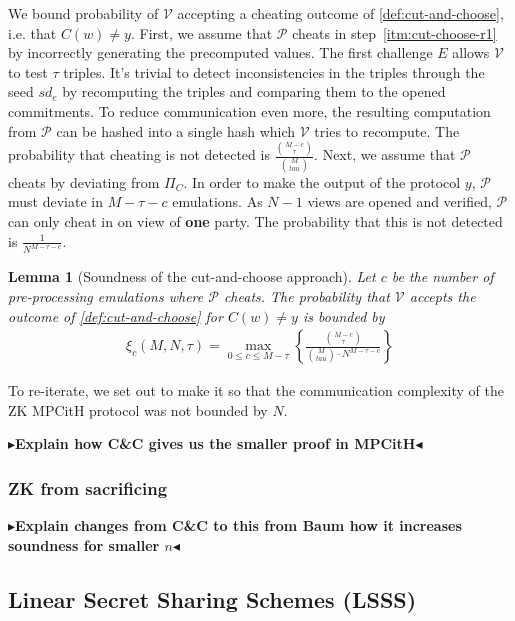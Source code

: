 \documentclass[twoside,11pt]{report}
\theoremstyle{definition}
\theoremstyle{plain}
\newtheorem{lemma}{Lemma}[section]
\newcommand{\todo}[1]{{\color[rgb]{.5,0,0}\textbf{$\blacktriangleright$#1$\blacktriangleleft$}}}
\begin{document}
We bound probability of $\mathcal{V}$ accepting a cheating outcome of \autoref{def:cut-and-choose}, i.e. that $C(w) \neq y$. First, we assume that $\mathcal{P}$ cheats in step~\ref{itm:cut-choose-r1} by incorrectly generating the precomputed values. The first challenge $E$ allows $\mathcal{V}$ to test $\tau$ triples. It's trivial to detect inconsistencies in the triples through the seed $sd_e$ by recomputing the triples and comparing them to the opened commitments. To reduce communication even more, the resulting computation from $\mathcal{P}$ can be hashed into a single hash which $\mathcal{V}$ tries to recompute. The probability that cheating is not detected is $\frac{\binom{M-c}{\tau}}{\binom{M}{tau}}$. Next, we assume that $\mathcal{P}$ cheats by deviating from $\Pi_C$. In order to make the output of the protocol $y$, $\mathcal{P}$ must deviate in $M-\tau-c$ emulations. As $N-1$ views are opened and verified, $\mathcal{P}$ can only cheat in on view of \textbf{one} party. The probability that this is not detected is $\frac{1}{N^{M-\tau-c}}$.

\begin{lemma}[Soundness of the cut-and-choose approach]\label{lem:cut-and-choose-soundness}
  Let $c$ be the number of pre-processing emulations where $\mathcal{P}$ cheats. The probability that $\mathcal{V}$ accepts the outcome of \autoref{def:cut-and-choose} for $C(w) \neq y$ is bounded by
  \begin{align*}
    \xi_c(M, N, \tau) = \max_{0 \leq c \leq M-\tau} \left\{\frac{\binom{M-c}{\tau}}{\binom{M}{tau} \cdot N^{M-\tau-c}} \right\}
  \end{align*}
\end{lemma}

To re-iterate, we set out to make it so that the communication complexity of the ZK MPCitH protocol was not bounded by $N$.

\todo{Explain how C\&C gives us the smaller proof in MPCitH}

\subsubsection{ZK from sacrificing}\label{sec:zk-sacrifice}

\todo{Explain changes from C\&C to this from Baum how it increases soundness for smaller $n$}

\subsection{Linear Secret Sharing Schemes (LSSS)}\label{sec:lsss}
\end{document}

